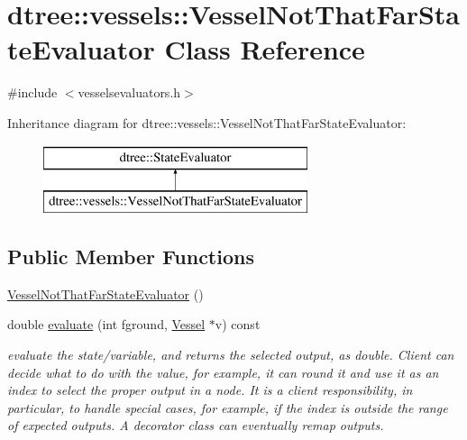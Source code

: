 \hypertarget{classdtree_1_1vessels_1_1_vessel_not_that_far_state_evaluator}{}\section{dtree\+::vessels\+::Vessel\+Not\+That\+Far\+State\+Evaluator Class Reference}
\label{classdtree_1_1vessels_1_1_vessel_not_that_far_state_evaluator}


{\ttfamily \#include $<$vesselsevaluators.\+h$>$}

Inheritance diagram for dtree\+::vessels\+::Vessel\+Not\+That\+Far\+State\+Evaluator\+:\begin{figure}[H]
\begin{center}
\leavevmode
\includegraphics[height=2.000000cm]{d9/d89/classdtree_1_1vessels_1_1_vessel_not_that_far_state_evaluator}
\end{center}
\end{figure}
\subsection*{Public Member Functions}
\begin{DoxyCompactItemize}
\item 
\mbox{\hyperlink{classdtree_1_1vessels_1_1_vessel_not_that_far_state_evaluator_a075f8c4afd803cb570c3673e4aa625c1}{Vessel\+Not\+That\+Far\+State\+Evaluator}} ()
\item 
double \mbox{\hyperlink{classdtree_1_1vessels_1_1_vessel_not_that_far_state_evaluator_a6672d1df8fb546774e9b9e602e415452}{evaluate}} (int fground, \mbox{\hyperlink{class_vessel}{Vessel}} $\ast$v) const
\begin{DoxyCompactList}\small\item\em evaluate the state/variable, and returns the selected output, as double. Client can decide what to do with the value, for example, it can round it and use it as an index to select the proper output in a node. It is a client responsibility, in particular, to handle special cases, for example, if the index is outside the range of expected outputs. A decorator class can eventually remap outputs. \end{DoxyCompactList}\end{DoxyCompactItemize}


